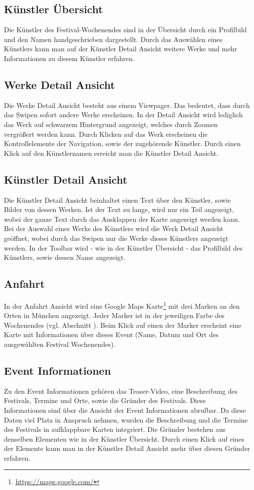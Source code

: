 \subsection{Künstler Übersicht}
Die Künstler des Festival-Wochenendes sind in der Übersicht durch ein Profilbild und den Namen handgeschrieben dargestellt. Durch das Auswählen eines Künstlers kann man auf der Künstler Detail Ansicht weitere Werke und mehr Informationen zu diesem Künstler erfahren.

\subsection{Werke Detail Ansicht}
Die Werke Detail Ansicht besteht aus einem Viewpager. Das bedeutet, dass durch das Swipen sofort andere Werke erscheinen. In der Detail Ansicht wird lediglich das Werk auf schwarzem Hintergrund angezeigt, welches durch Zoomen vergrößert werden kann. Durch Klicken auf das Werk erscheinen die Kontrollelemente der Navigation, sowie der zugehörende Künstler. Durch einen Klick auf den Künstlernamen erreicht man die Künstler Detail Ansicht.

\subsection{Künstler Detail Ansicht}
Die Künstler Detail Ansicht beinhaltet einen Text über den Künstler, sowie Bilder von dessen Werken. Ist der Text zu lange, wird nur ein Teil angezeigt, wobei der ganze Text durch das Ausklappen der Karte angezeigt werden kann. Bei der Auswahl eines Werks des Künstlers wird die Werk Detail Ansicht geöffnet, wobei durch das Swipen nur die Werke dieses Künstlers angezeigt werden. In der Toolbar wird - wie in der Künstler Übersicht - das Profilbild des Künstlers, sowie dessen Name angezeigt. 

\subsection{Anfahrt}
In der Anfahrt Ansicht wird eine Google Maps Karte\footnote{\url{https://maps.google.com/}} mit drei Marken an den Orten in München angezeigt. Jeder Marker ist in der jeweiligen Farbe des Wochenendes (vgl. Abschnitt ). Beim Klick auf einen der Marker erscheint eine Karte mit Informationen über dieses Event (Name, Datum und Ort des ausgewählten Festival Wochenendes). 

\subsection{Event Informationen}
Zu den Event Informationen gehören das Teaser-Video, eine Beschreibung des Festivals, Termine und Orte, sowie die Gründer des Festivals. Diese Informationen sind über die Ansicht der Event Informationen abrufbar. Da diese Daten viel Platz in Anspruch nehmen, wurden die Beschreibung und die Termine des Festivals in aufklappbare Karten integriert. Die Gründer bestehen aus denselben Elementen wie in der Künstler Übersicht. Durch einen Klick auf eines der Elemente kann man in der Künstler Detail Ansicht mehr über diesen Gründer erfahren.

